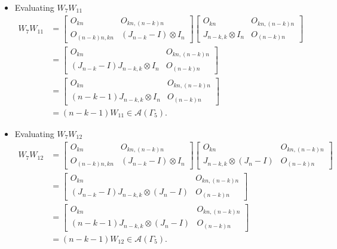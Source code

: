 \begin{itemize}
\item Evaluating $W_{7}W_{11}$
\begin{align*}
    W_7W_{11}
    &= \begin{bmatrix}
        O_{kn} & O_{kn, (n-k)n} \\
        O_{(n-k)n,kn} & (J_{n - k} - I) \otimes I_n
    \end{bmatrix}
    \begin{bmatrix}
        O_{kn} & O_{kn, (n-k)n} \\
        J_{n-k, k}\otimes I_n & O_{(n-k)n}
    \end{bmatrix}\\
    &= \begin{bmatrix}
        O_{kn} & O_{kn, (n-k)n} \\
        (J_{n - k} - I)J_{n-k, k}\otimes I_n & O_{(n-k)n}
    \end{bmatrix}\\
    &= \begin{bmatrix}
        O_{kn} & O_{kn, (n-k)n} \\
        (n-k-1)J_{n-k, k}\otimes I_n & O_{(n-k)n}
    \end{bmatrix}\\
    &= (n-k-1)W_{11}\in\mathcal{A}(\Gamma_5).
\end{align*}

\item Evaluating $W_{7}W_{12}$
\begin{align*}
    W_7W_{12}
    &= \begin{bmatrix}
        O_{kn} & O_{kn, (n-k)n} \\
        O_{(n-k)n,kn} & (J_{n - k} - I) \otimes I_n
    \end{bmatrix}
    \begin{bmatrix}
        O_{kn} & O_{kn, (n-k)n} \\
        J_{n-k, k}\otimes (J_n-I) & O_{(n-k)n}
    \end{bmatrix}\\
    &= \begin{bmatrix}
        O_{kn} & O_{kn, (n-k)n} \\
        (J_{n - k} - I)J_{n-k, k}\otimes (J_n-I) & O_{(n-k)n}
    \end{bmatrix}\\
    &= \begin{bmatrix}
        O_{kn} & O_{kn, (n-k)n} \\
        (n-k-1)J_{n-k, k}\otimes (J_n-I) & O_{(n-k)n}
    \end{bmatrix}\\
    &= (n-k-1)W_{12}\in\mathcal{A}(\Gamma_5).
\end{align*}


\end{itemize}
